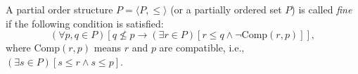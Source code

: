 A partial order structure $P = \langle P, \leq \rangle$ (or a partially ordered set $P$) is called \textit{fine} if the following condition is satisfied:
$$(\forall p, q \in P)[q \not\leq p \rightarrow (\exists r \in P)[r \leq q \land \neg \text{Comp}(r, p)]],$$
where $\text{Comp}(r, p)$ means $r$ and $p$ are compatible, i.e., $(\exists s \in P)[s \leq r \land s \leq p]$.
